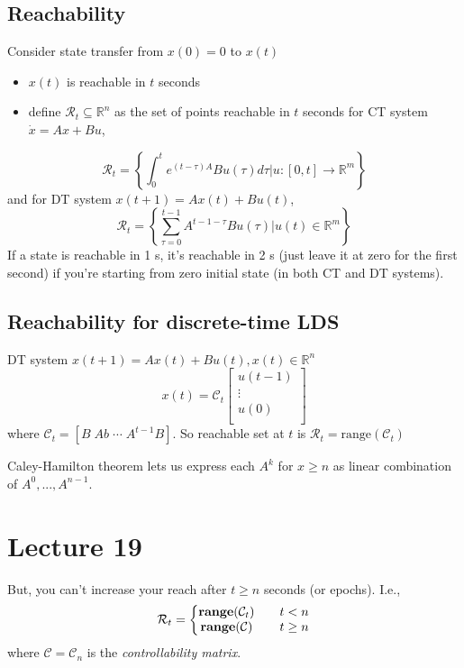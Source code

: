 \documentclass[10pt,letterpaper]{article}
\begin{document}
\subsection{Reachability}
\label{sec-17_4}

Consider state transfer from $x(0)= 0$ to $x(t)$ 
\begin{itemize}
\item $x(t)$ is reachable in $t$ seconds
\item define $\mathcal R _{t} \subseteq \mathbb{R}^{n}$ as the set of points reachable in $t$ seconds for CT system $\dot x=Ax+Bu$,
\end{itemize}
$$
\mathcal R _{t} = \left\{\int ^{t} _{0} e ^{(t-\tau)A} Bu(\tau) d\tau \big| u:[0,t] \rightarrow \mathbb{R}^{m} \right\}
$$
and for DT system $x(t+1)= Ax(t) + Bu(t)$,
$$
\mathcal R _{t} = \left\{\sum ^{t-1} _{\tau=0} A ^{t-1-\tau} Bu(\tau) \big| u(t) \in \mathbb{R}^{m} \right\}
$$
If a state is reachable in 1 s, it's reachable in 2 s (just leave it at zero for the first second) if you're starting from zero initial state (in both CT and DT systems).
\subsection{Reachability for discrete-time LDS}
\label{sec-17_5}

DT system $x(t+1)= Ax(t)+Bu(t), x(t) \in \mathbb{R}^{n}$
$$
x(t)= \mathcal C_t
\begin{bmatrix}
  u(t-1) \\
  \vdots \\
  u(0)   \\
\end{bmatrix}
$$
where $\mathcal C_t = [B \; Ab \; \cdots \; A ^{t-1} B]$. So reachable set at $t$ is $\mathcal{R}_t = \text{range} (\mathcal C_t)$


Caley-Hamilton theorem lets us express each $A ^{k}$ for $x\ge n$ as linear combination of $A ^{0} ,...,A ^{n-1}$.
\section{Lecture 19}
\label{sec-18}

But, you can't increase your reach after $t \ge n$ seconds (or epochs). I.e.,
$$
\mathcal R_t = \left\{
\begin{matrix}
  {\bf range} (\mathcal C_t) & \quad t<n    \\
  {\bf range} (\mathcal C)   & \quad t\ge n \\
\end{matrix}
\right.
$$
where $\mathcal C=\mathcal C _{n}$ is the \emph{controllability matrix}.
\end{document}
